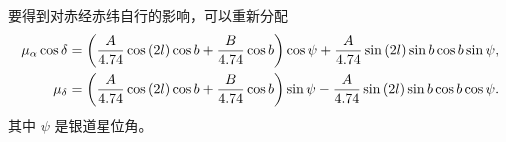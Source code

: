\documentclass[UTF8, 12pt, a4paper, oneside, onecolumn, fontset=none]{ctexart}
\begin{document}
要得到对赤经赤纬自行的影响，可以重新分配
\begin{align}
\mu_{\alpha}\cos{\delta}&=\mleft(\frac{A}{4.74}\cos{\mleft(2l\mright)}\cos{b}+\frac{B}{4.74}\cos{b}\mright)\cos{\psi}+\frac{A}{4.74}\sin{\mleft(2l\mright)}\sin{b}\cos{b}\sin{\psi},\\
\mu_{\delta}&=\mleft(\frac{A}{4.74}\cos{\mleft(2l\mright)}\cos{b}+\frac{B}{4.74}\cos{b}\mright)\sin{\psi}-\frac{A}{4.74}\sin{\mleft(2l\mright)}\sin{b}\cos{b}\cos{\psi}.
\end{align}
其中 $\psi$ 是银道星位角。

\end{document}
